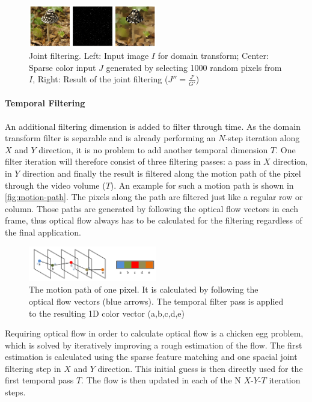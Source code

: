 \documentclass{utue} %
\begin{document}
\begin{figure}[h!]
  \centering
  \includegraphics[width=0.5\textwidth]{images/joint-filter.jpg}
  \caption{Joint filtering. Left: Input image $I$ for domain transform; Center: Sparse
  color input $J$ generated by selecting 1000 random pixels from $I$, Right:
  Result of the joint filtering ($J''=\frac{J'}{G'}$)}
  \label{fig:joint-filter}
\end{figure}

\paragraph{Temporal Filtering} \label{temporal-filtering}
An additional filtering dimension is added to filter through time. As the domain
transform filter is separable and is already performing an $N$-step iteration
along $X$ and $Y$ direction, it is no problem to add another temporal dimension
$T$. One filter iteration will therefore consist of three filtering passes: a
pass in $X$ direction, in $Y$ direction and finally the result is filtered along
the motion path of the pixel through the video volume ($T$). An example for such
a motion path is shown in \autoref{fig:motion-path}. The pixels along the path
are filtered just like a regular row or column. Those paths are generated by
following the optical flow vectors in each frame, thus optical flow always has
to be calculated for the filtering regardless of the final application. 

\begin{figure}[htb]
  \centering
  \includegraphics[width=0.5\textwidth]{images/paths.png}
  \caption{The motion path of one pixel. It is calculated by following the
  optical flow vectors (blue arrows). The temporal filter pass is applied to the
resulting 1D color vector (a,b,c,d,e)}
  \label{fig:motion-path}
\end{figure}

Requiring optical flow in order to calculate optical flow is a chicken egg
problem, which is solved by iteratively improving a rough estimation of the
flow. The first estimation is calculated using the sparse feature matching and
one spacial joint filtering step in $X$ and $Y$ direction. This initial guess is
then directly used for the first temporal pass $T$. The flow is then updated in
each of the N $X$-$Y$-$T$ iteration steps.
\end{document}
